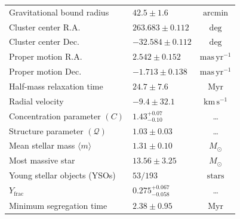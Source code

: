 \documentclass{aa}
\begin{document}
\begin{table}
{\begin{tabular}{llc}
			Gravitational bound radius              & $42.5 \pm 1.6$            & $\mathrm{arcmin}$                  \\
			Cluster center R.A.                     & $263.683 \pm 0.112$ & $\mathrm{deg}$                     \\
			Cluster center Dec.                     & $-32.584 \pm 0.112$ & $\mathrm{deg}$                     \\
			Proper motion R.A.                      & $2.542 \pm 0.152$  & $\mathrm{mas\,yr^{-1}}$            \\
			Proper motion Dec.                      & $-1.713 \pm 0.138$ & $\mathrm{mas\,yr^{-1}}$            \\
			Half-mass relaxation time               & $24.7 \pm 7.6$             & $\mathrm{Myr}$                     \\
			Radial velocity                         & $-9.4 \pm 32.1$  & $\mathrm{km\,s^{-1}}$              \\
			Concentration parameter $(C)$           & $1.43^{+0.07}_{-0.10}$    & \ldots                             \\
			Structure parameter $(\mathcal{Q})$     & $1.03 \pm 0.03$    & \ldots                             \\
			Mean stellar mass $\langle m \rangle$   & $1.31 \pm 0.10$    & $M_\odot$                          \\
			Most massive star                       & $13.56 \pm 3.25$   & $M_\odot$                          \\
			Young stellar objects (YSOs)            & $53/193$            & $\mathrm{stars}$                   \\
			$Y_{\text{frac}}$                       & $0.275^{+0.067}_{-0.058}$          & \ldots                             \\
			Minimum segregation time                & $2.38 \pm 0.95$             & $\mathrm{Myr}$                     \\ \hline
		\end{tabular}%
	}

\end{table}
\end{document}
